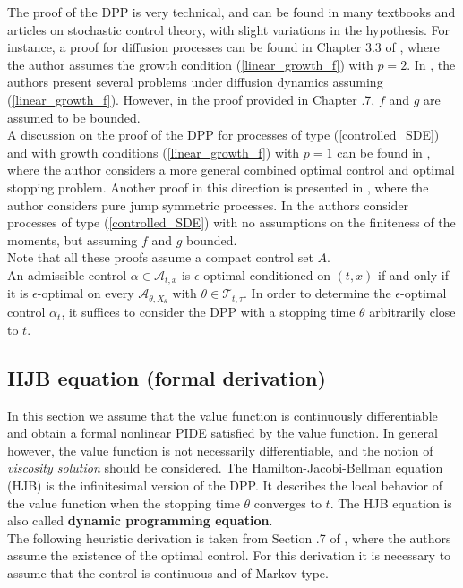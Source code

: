 The proof of the DPP is very technical, and can be found in many textbooks and articles on stochastic control theory, with slight variations in the hypothesis.   
For instance, a proof for diffusion processes can be found in Chapter 3.3 of \cite{Pham}, 
where the author assumes the growth condition (\ref{linear_growth_f}) with $p=2$. 
In \cite{FlemingSoner}, the authors present several problems under diffusion dynamics assuming (\ref{linear_growth_f}).
However, in the proof provided in Chapter .7, $f$ and $g$ are assumed to be bounded. \\ 
A discussion on the proof of the DPP for processes of type (\ref{controlled_SDE}) and with growth conditions (\ref{linear_growth_f}) with $p=1$ can be found in \cite{Ph98}, 
where the author considers a more general combined optimal control and optimal stopping problem. 
Another proof in this direction is presented in \cite{Zalin11}, where the author considers pure jump symmetric processes. 
In \cite{Gol16} the authors consider processes of type (\ref{controlled_SDE}) with no assumptions on the finiteness of the moments, but assuming $f$ and $g$ bounded.\\
Note that all these proofs assume a compact control set $A$.\\

An admissible control $\alpha \in \mathcal{A}_{t,x}$ is $\epsilon$-optimal conditioned on $(t,x)$ if and only if it is $\epsilon$-optimal 
on every $\mathcal{A}_{\theta, X_{\theta}}$ with 
$\theta \in \mathcal{T}_{t,\tau}$. In order to determine the $\epsilon$-optimal control $\alpha_t$, it suffices to consider the DPP with a stopping time $\theta$
arbitrarily close to $t$.

\subsection{HJB equation (formal derivation)}

In this section we assume that the value function is continuously differentiable and obtain a formal nonlinear PIDE satisfied by the value function.
In general however, the value function is not necessarily differentiable, and the notion of \emph{viscosity solution} should be considered.
The Hamilton-Jacobi-Bellman equation (HJB) is the infinitesimal version of the DPP. It describes the local behavior of the value function when the stopping time $\theta$ converges to $t$. 
The HJB equation is also called \textbf{dynamic programming equation}.\\
The following heuristic derivation is taken from Section .7 of \cite{FlemingSoner}, where the authors assume the existence of the optimal control.
For this derivation it is necessary to assume that the control is continuous and of Markov type. 
\newline

